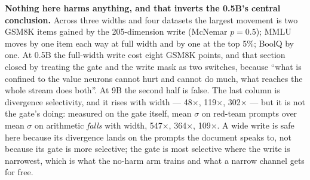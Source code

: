 \documentclass[11pt]{article}
\newcommand{\code}[1]{\texttt{#1}}
\begin{document}
\begin{table}[t]
\centering
\caption{Constitution bridge at 9B by write width. CE and agreement $n = 50$ at 24 generated tokens; benchmarks and red-team refusal $n = 100$ at the guard-rail's own budgets (384 tokens for GSM8K, 128 for red-team). The zeroed arm equals the base arm to four decimals in all six evaluations. KL selectivity is the ratio of the red-team KL to the GSM8K KL; the gate's own selectivity, the same ratio on mean $\sigma$, is 547$\times$, 364$\times$ and 109$\times$ --- highest where the write is narrowest. The teacher row is the stored teacher continuations of \code{results/constitution/teacher\_signal\_qwen35.json} ($n = 100$ on both splits, where the base reads 0.67 and 0.03), a reference point rather than a paired arm. MMLU is scored with the repaired parser of Section~\ref{sec:repro2}.}
\label{tab:const9b}
\small
{}
\end{table}

\textbf{Nothing here harms anything, and that inverts the 0.5B's central conclusion.} Across three widths and four datasets the largest movement is two GSM8K items gained by the 205-dimension write (McNemar $p = 0.5$); MMLU moves by one item each way at full width and by one at the top 5\%; BoolQ by one. At 0.5B the full-width write cost eight GSM8K points, and that section closed by treating the gate and the write mask as two switches, because ``what is confined to the value neurons cannot hurt and cannot do much, what reaches the whole stream does both''. At 9B the second half is false. The last column is divergence selectivity, and it rises with width --- 48$\times$, 119$\times$, 302$\times$ --- but it is not the gate's doing: measured on the gate itself, mean $\sigma$ on red-team prompts over mean $\sigma$ on arithmetic \emph{falls} with width, 547$\times$, 364$\times$, 109$\times$. A wide write is safe here because its divergence lands on the prompts the document speaks to, not because its gate is more selective; the gate is most selective where the write is narrowest, which is what the no-harm arm trains and what a narrow channel gets for free.
\end{document}
